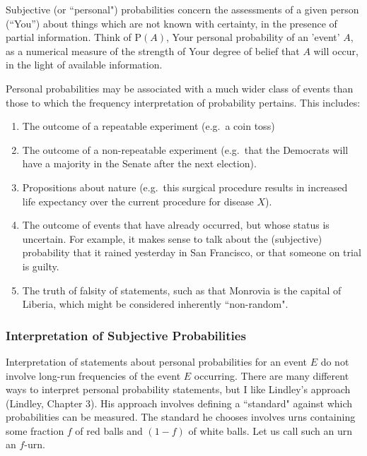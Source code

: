 \documentclass{article}[11pt]
\def\P{\mbox{P}}
\begin{document}
Subjective (or ``personal") probabilities concern the assessments of a given person
(``You'') about things which are not known with certainty, in the
presence of partial information.  Think of $\P(A)$, Your personal
probability of an 'event' $A$, as a numerical measure of the strength of
Your degree of belief that $A$ will occur, in the light of available
information.

Personal probabilities may be associated with a much wider class of
events than those to which the frequency interpretation of probability
pertains.  This includes:
\begin{enumerate}
\item The outcome of a repeatable experiment (e.g.\ a coin toss)
\item The outcome of a non-repeatable experiment (e.g.\ that the Democrats will have a majority in the Senate after the next election).
\item Propositions about nature (e.g.\ this surgical procedure results
  in increased life expectancy over the current procedure for disease
 $X$).
\item  The outcome of events that have already occurred, but whose status is uncertain. For example, it makes sense to talk about the (subjective) probability that it rained yesterday in San Francisco, or that someone on trial is guilty. 
\item The truth of falsity of statements, such as that Monrovia is the capital of Liberia, which might be considered inherently ``non-random". 
\end{enumerate}

\subsubsection{Interpretation of Subjective Probabilities}

Interpretation of statements about personal probabilities for an event $E$ do not involve
long-run frequencies of the event $E$ occurring. There are many different
ways to interpret personal probability statements, 
but I like Lindley's approach (Lindley, Chapter 3).
His approach involves defining a ``standard" 
against which probabilities can be measured.
The standard he chooses involves urns containing some fraction $f$ of red balls and $(1-f)$ of white balls. Let us call such an urn an $f$-urn. 
\end{document}
